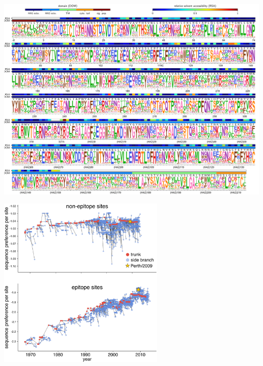 \documentclass[9pt,twocolumn,twoside]{pnas-new}
\newcommand{\comment}[1]{{\color{red}[\textsl{#1}]}}
\begin{document}
\begin{suppfigure}
\centerline{\includegraphics[width=\textwidth]{figs/S03_WSNprefs_logoplot/WSN-rescaled_prefs.pdf}}
\caption{\label{suppfig:WSNprefs_logoplot}
{\bf The site-specific amino-acid preferences of the WSN/1933 H1 HA.} 
The amino-acid preferences from~\cite{doud2016accurate} after taking the average of the experimental replicates and re-scaling~\cite{hilton2017phydms} by the stringency parameter \comment{somehow indicate where this stringency parameter}.
The sites are in H3 numbering.
\comment{I would suggest just getting rid of RSA. You might be able to replace the next two sentences by just saying: the overlays show the same information as in Figure X}.
The bottom overlay bar indicates the HA domain (sig. pep. = signal peptide, HA1 ecto. = HA1 ectodomain, HA2 ecto. = HA2 ectodomain, TM = transmembrane domain, cyto. tail. = cytoplasmic tail).
The letters directly above each logo stack indicate the wildtype amino acid at that site.
}
\end{suppfigure}

\begin{suppfigure}
\centerline{\includegraphics[width=0.6\textwidth]{figs/S04_seqpref_zoomed/seqpref_zoomed.pdf}}
\caption{\label{suppfig:seqpref_zoomed}
{\bf The per-site sequence preference at epitope and non-epitope sites}
The per-site sequence preferences shown in Figure~\ref{fig:sequence_preference}B, but on their own y-axes.
}
\end{suppfigure}
\end{document}
